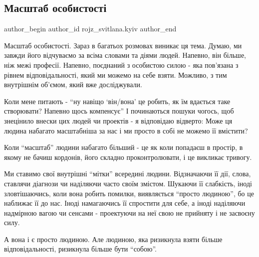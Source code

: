  
 
 
 
 
 
\subsection{Масштаб особистості}
\label{sec:13_12_2022.fb.rojz_svitlana.kyiv.1.masshtab_osobystosti}
 
\ifcmt
 author_begin
   author_id rojz_svitlana.kyiv
 author_end
\fi

Масштаб особистості. Зараз в багатьох розмовах виникає ця тема. Думаю, ми
завжди його відчуваємо за всіма словами та діями людей. Напевно, він більше,
ніж межі професії. Напевно, поєднаний з особистою силою - яка пов'язана з
рівнем відповідальності, який ми можемо на себе взяти. Можливо, з тим
внутрішнім об'ємом, який вже досліджували. 

Коли мене питають - \enquote{ну навіщо \enquote{він/вона} це робить, як їм
вдається таке створювати? Напевно щось компенсує} І починаються пошуки чогось,
щоб знецінило внески цих людей чи проектів - я відповідаю відверто: Може ця
людина набагато масштабніша за нас і ми просто в собі не можемо її вмістити? 

Коли \enquote{масштаб} людини набагато більший - це як коли попадаєш в простір, в якому
не бачиш кордонів, його складно проконтролювати, і це викликає тривогу. 

Ми ставимо свої внутрішні \enquote{мітки} всередині людини. Відзначаючи її дії, слова,
ставлячи діагнози чи наділяючи часто своїм змістом. Шукаючи її слабкість, іноді
зловтішаючись, коли вона робить помилки, виявляється \enquote{просто людиною}, бо це
наближає її до нас.  Іноді намагаючись її спростити для себе, а іноді наділяючи
надмірною вагою чи сенсами - проектуючи на неї свою не прийняту і не засвоєну
силу.

А вона і є просто людиною. Але людиною, яка ризикнула взяти більше
відповідальності, ризикнула більше бути \enquote{собою}. 

